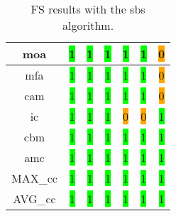 \begin{table}[H]
\begin{tabular}{|c|c|c|c|c|c|c|}
        \acrshort{moa} & \colorbox{lime}{1} & \colorbox{lime}{1} & \colorbox{lime}{1} & \colorbox{lime}{1} & \colorbox{lime}{1} & \colorbox{orange}{0} \\ \hline
        \acrshort{mfa} & \colorbox{lime}{1} & \colorbox{lime}{1} & \colorbox{lime}{1} & \colorbox{lime}{1} & \colorbox{lime}{1} & \colorbox{orange}{0} \\ \hline
        \acrshort{cam} & \colorbox{lime}{1} & \colorbox{lime}{1} & \colorbox{lime}{1} & \colorbox{lime}{1} & \colorbox{lime}{1} & \colorbox{orange}{0} \\ \hline
        \acrshort{ic} & \colorbox{lime}{1} & \colorbox{lime}{1} & \colorbox{lime}{1} & \colorbox{orange}{0} & \colorbox{orange}{0} & \colorbox{lime}{1} \\ \hline
        \acrshort{cbm} & \colorbox{lime}{1} & \colorbox{lime}{1} & \colorbox{lime}{1} & \colorbox{lime}{1} & \colorbox{lime}{1} & \colorbox{lime}{1} \\ \hline
        \acrshort{amc} & \colorbox{lime}{1} & \colorbox{lime}{1} & \colorbox{lime}{1} & \colorbox{lime}{1} & \colorbox{lime}{1} & \colorbox{lime}{1} \\ \hline
        MAX\_\acrshort{cc} & \colorbox{lime}{1} & \colorbox{lime}{1} & \colorbox{lime}{1} & \colorbox{lime}{1} & \colorbox{lime}{1} & \colorbox{lime}{1} \\ \hline
        AVG\_\acrshort{cc} & \colorbox{lime}{1} & \colorbox{lime}{1} & \colorbox{lime}{1} & \colorbox{lime}{1} & \colorbox{lime}{1} & \colorbox{lime}{1} \\ \hline
    \end{tabular}
\caption{FS results with the \acrlong{sbs} algorithm.}
\label{tab:sbs-output}
\end{table}

